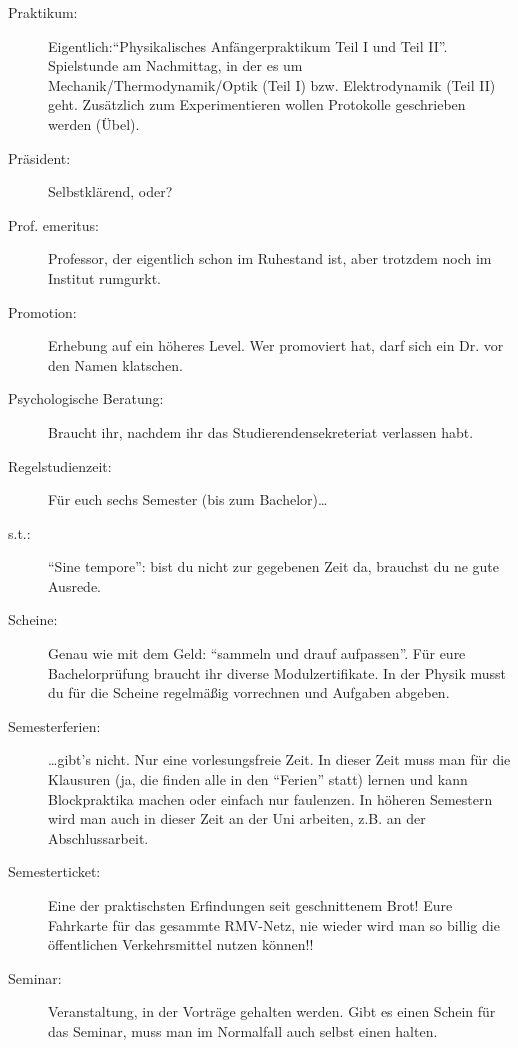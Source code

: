 \begin{description}
    \item[Praktikum:] Eigentlich:\enquote{Physikalisches Anfängerpraktikum Teil I und Teil II}.
Spielstunde am Nachmittag, in der es um Mechanik/Thermodynamik/Optik (Teil I) bzw.
Elektrodynamik (Teil II) geht. Zusätzlich zum Experimentieren
wollen Protokolle geschrieben werden (Übel).

    \item[Präsident:] Selbstklärend, oder?

    \item[Prof. emeritus:] Professor, der eigentlich schon
im Ruhestand ist, aber trotzdem noch im Institut rumgurkt.

    \item[Promotion:] Erhebung auf ein höheres Level.
    Wer promoviert hat, darf sich ein Dr. vor den Namen klatschen.

\item[Psychologische Beratung:] Braucht ihr, nachdem ihr das Studierendensekreteriat verlassen habt.

    \item[Regelstudienzeit:] Für euch sechs Semester (bis zum Bachelor)\ldots

    \item[s.t.:]\enquote{Sine tempore}: bist du
nicht zur gegebenen Zeit da, brauchst du ne gute Ausrede.

    \item[Scheine:]Genau wie mit dem Geld: \enquote{sammeln und drauf aufpassen}.
    Für eure Bachelorprüfung braucht ihr diverse Modulzertifikate.
In der Physik musst du für die Scheine regelmäßig vorrechnen und Aufgaben
abgeben.

    \item[Semesterferien:] \ldots gibt's nicht.
    Nur eine vorlesungsfreie Zeit.
In dieser Zeit muss man für die Klausuren (ja, die finden alle in den \enquote{Ferien} statt)
lernen und kann Blockpraktika machen oder einfach nur faulenzen. In höheren Semestern
wird man auch in dieser Zeit an der Uni arbeiten, z.B. an der
Abschlussarbeit.

    \item[Semesterticket:] Eine der praktischsten Erfindungen
seit geschnittenem Brot! Eure Fahrkarte für das gesammte RMV-Netz,
nie wieder wird man so billig die öffentlichen Verkehrsmittel
nutzen können!!

    \item[Seminar:] Veranstaltung, in der
Vorträge gehalten werden. Gibt es einen Schein für das Seminar,
muss man im Normalfall auch selbst einen halten.


\end{description}
